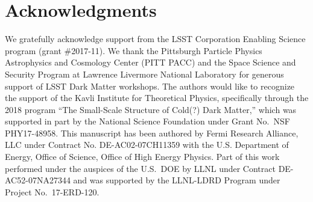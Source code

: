 \chapter*{Acknowledgments}

We gratefully acknowledge support from the LSST Corporation Enabling Science program (grant \#2017-11).
We thank the Pittsburgh Particle Physics Astrophysics and Cosmology Center (PITT PACC) and the Space Science and Security Program at Lawrence Livermore National Laboratory for generous support of LSST Dark Matter workshops. 
The authors would like to recognize the support of the Kavli Institute for Theoretical Physics, specifically through the 2018 program ``The Small-Scale Structure of Cold(?) Dark Matter,'' which was supported in part by the National Science Foundation under Grant No.\ NSF PHY17-48958.
This manuscript has been authored by Fermi Research Alliance, LLC under Contract No. DE-AC02-07CH11359 with the U.S. Department of Energy, Office of Science, Office of High Energy Physics. 
Part of this work performed under the auspices of the U.S.\ DOE by LLNL under Contract DE-AC52-07NA27344 and was supported by the LLNL-LDRD Program under Project No.\ 17-ERD-120.









